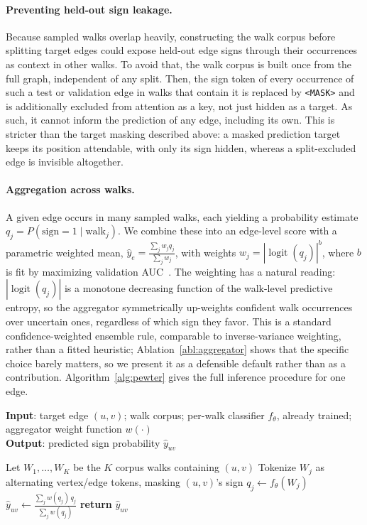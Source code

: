 \documentclass[sigconf, review, anonymous]{acmart}
\theoremstyle{plain}
\theoremstyle{definition}
\begin{document}
\paragraph{Preventing held-out sign leakage.} Because sampled walks overlap heavily, constructing the walk corpus before splitting target edges could expose held-out edge signs through their occurrences as context in other walks. To avoid that,  the walk corpus is built once from the full graph, independent of any split. Then, the sign token of every occurrence of such a test or validation edge in walks that contain it is replaced by \texttt{<MASK>} and is additionally excluded from attention as a key, not just hidden as a target. As such, it cannot inform the prediction of any edge, including its own. This is stricter than the target masking described above: a masked prediction target keeps its position attendable, with only its sign hidden, whereas a split-excluded edge is invisible altogether.

\paragraph{Aggregation across walks.} A given edge occurs in many sampled walks, each yielding a probability estimate $q_j=P(\text{sign}=1\mid \text{walk}_j)$. We combine these into an edge-level score with a parametric weighted mean, $\hat{y}_e = \frac{\sum_j w_j q_j}{\sum_j w_j}$, with weights $w_j = |\operatorname{logit}(q_j)|^{b}$, where $b$ is fit by maximizing validation AUC~\citep{nelder1965simplex}. The weighting has a natural reading: $|\operatorname{logit}(q_j)|$ is a monotone decreasing function of the walk-level predictive entropy, so the aggregator symmetrically up-weights confident walk occurrences over uncertain ones, regardless of which sign they favor. This is a standard confidence-weighted ensemble rule, comparable to inverse-variance weighting, rather than a fitted heuristic; Ablation~\ref{abl:aggregator} shows that the specific choice barely matters, so we present it as a defensible default rather than as a contribution. Algorithm~\ref{alg:pewter} gives the full inference procedure for one edge.

\begin{algorithm}[tb]
\caption{Pewter: inference for edge $(u,v)$}
\label{alg:pewter}
\textbf{Input}: target edge $(u,v)$; walk corpus; per-walk classifier $f_\theta$, already trained; aggregator weight function $w(\cdot)$\\
\textbf{Output}: predicted sign probability $\hat y_{uv}$
\begin{algorithmic}[1]
\STATE Let $W_1,\ldots,W_K$ be the $K$ corpus walks containing $(u,v)$
  \STATE Tokenize $W_j$ as alternating vertex/edge tokens, masking $(u,v)$'s sign
  \STATE $q_j \gets f_\theta(W_j)$ 
\ENDFOR
\STATE $\hat y_{uv} \gets \frac{\sum_j w(q_j)\, q_j}{\sum_j w(q_j)}$
\STATE \textbf{return} $\hat y_{uv}$
\end{algorithmic}
\end{algorithm}
\end{document}
